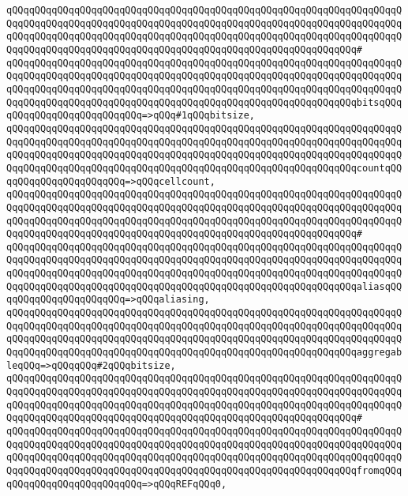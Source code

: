 \verb|qQQqqQQqqQQqqQQqqQQqqQQqqQQqqQQqqQQqqQQqqQQqqQQqqQQqqQQqqQQqqQQqqQQqqQQqqQQqqQQqqQQqqQQqqQQqqQQqqQQqqQQqqQQqqQQqqQQqqQQqqQQqqQQqqQQqqQQqqQQqqQQqqQQqqQQqqQQqqQQqqQQqqQQqqQQqqQQqqQQqqQQqqQQqqQQqqQQqqQQqqQQqqQQqqQQqqQQqqQQqqQQqqQQqqQQqqQQqqQQqqQQqqQQqqQQqqQQqqQQqqQQqqQQqqQQq#|\newline
\verb|qQQqqQQqqQQqqQQqqQQqqQQqqQQqqQQqqQQqqQQqqQQqqQQqqQQqqQQqqQQqqQQqqQQqqQQqqQQqqQQqqQQqqQQqqQQqqQQqqQQqqQQqqQQqqQQqqQQqqQQqqQQqqQQqqQQqqQQqqQQqqQQqqQQqqQQqqQQqqQQqqQQqqQQqqQQqqQQqqQQqqQQqqQQqqQQqqQQqqQQqqQQqqQQqqQQqqQQqqQQqqQQqqQQqqQQqqQQqqQQqqQQqqQQqqQQqqQQqqQQqqQQqqQQqqQQqbitsqQQqqQQqqQQqqQQqqQQqqQQqqQQq=>qQQq#1qQQqbitsize,|\newline
\verb|qQQqqQQqqQQqqQQqqQQqqQQqqQQqqQQqqQQqqQQqqQQqqQQqqQQqqQQqqQQqqQQqqQQqqQQqqQQqqQQqqQQqqQQqqQQqqQQqqQQqqQQqqQQqqQQqqQQqqQQqqQQqqQQqqQQqqQQqqQQqqQQqqQQqqQQqqQQqqQQqqQQqqQQqqQQqqQQqqQQqqQQqqQQqqQQqqQQqqQQqqQQqqQQqqQQqqQQqqQQqqQQqqQQqqQQqqQQqqQQqqQQqqQQqqQQqqQQqqQQqqQQqqQQqqQQqcountqQQqqQQqqQQqqQQqqQQqqQQq=>qQQqcellcount,|\newline
\verb|qQQqqQQqqQQqqQQqqQQqqQQqqQQqqQQqqQQqqQQqqQQqqQQqqQQqqQQqqQQqqQQqqQQqqQQqqQQqqQQqqQQqqQQqqQQqqQQqqQQqqQQqqQQqqQQqqQQqqQQqqQQqqQQqqQQqqQQqqQQqqQQqqQQqqQQqqQQqqQQqqQQqqQQqqQQqqQQqqQQqqQQqqQQqqQQqqQQqqQQqqQQqqQQqqQQqqQQqqQQqqQQqqQQqqQQqqQQqqQQqqQQqqQQqqQQqqQQqqQQqqQQqqQQqqQQq#|\newline
\verb|qQQqqQQqqQQqqQQqqQQqqQQqqQQqqQQqqQQqqQQqqQQqqQQqqQQqqQQqqQQqqQQqqQQqqQQqqQQqqQQqqQQqqQQqqQQqqQQqqQQqqQQqqQQqqQQqqQQqqQQqqQQqqQQqqQQqqQQqqQQqqQQqqQQqqQQqqQQqqQQqqQQqqQQqqQQqqQQqqQQqqQQqqQQqqQQqqQQqqQQqqQQqqQQqqQQqqQQqqQQqqQQqqQQqqQQqqQQqqQQqqQQqqQQqqQQqqQQqqQQqqQQqqQQqqQQqaliasqQQqqQQqqQQqqQQqqQQqqQQq=>qQQqaliasing,|\newline
\verb|qQQqqQQqqQQqqQQqqQQqqQQqqQQqqQQqqQQqqQQqqQQqqQQqqQQqqQQqqQQqqQQqqQQqqQQqqQQqqQQqqQQqqQQqqQQqqQQqqQQqqQQqqQQqqQQqqQQqqQQqqQQqqQQqqQQqqQQqqQQqqQQqqQQqqQQqqQQqqQQqqQQqqQQqqQQqqQQqqQQqqQQqqQQqqQQqqQQqqQQqqQQqqQQqqQQqqQQqqQQqqQQqqQQqqQQqqQQqqQQqqQQqqQQqqQQqqQQqqQQqqQQqqQQqqQQqaggregableqQQq=>qQQqqQQq#2qQQqbitsize,|\newline
\verb|qQQqqQQqqQQqqQQqqQQqqQQqqQQqqQQqqQQqqQQqqQQqqQQqqQQqqQQqqQQqqQQqqQQqqQQqqQQqqQQqqQQqqQQqqQQqqQQqqQQqqQQqqQQqqQQqqQQqqQQqqQQqqQQqqQQqqQQqqQQqqQQqqQQqqQQqqQQqqQQqqQQqqQQqqQQqqQQqqQQqqQQqqQQqqQQqqQQqqQQqqQQqqQQqqQQqqQQqqQQqqQQqqQQqqQQqqQQqqQQqqQQqqQQqqQQqqQQqqQQqqQQqqQQqqQQq#|\newline
\verb|qQQqqQQqqQQqqQQqqQQqqQQqqQQqqQQqqQQqqQQqqQQqqQQqqQQqqQQqqQQqqQQqqQQqqQQqqQQqqQQqqQQqqQQqqQQqqQQqqQQqqQQqqQQqqQQqqQQqqQQqqQQqqQQqqQQqqQQqqQQqqQQqqQQqqQQqqQQqqQQqqQQqqQQqqQQqqQQqqQQqqQQqqQQqqQQqqQQqqQQqqQQqqQQqqQQqqQQqqQQqqQQqqQQqqQQqqQQqqQQqqQQqqQQqqQQqqQQqqQQqqQQqqQQqqQQqfromqQQqqQQqqQQqqQQqqQQqqQQqqQQq=>qQQqREFqQQq0,|\newline
